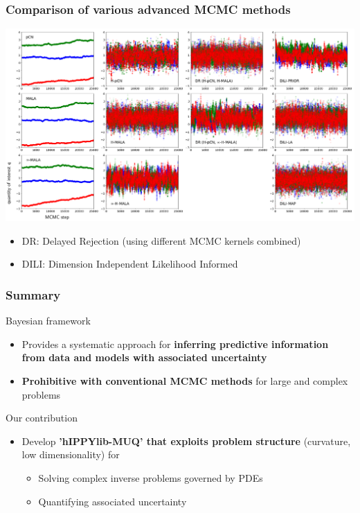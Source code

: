 \documentclass{beamer}
\begin{document}
\begin{frame}[c]
  \frametitle{Comparison of various advanced MCMC methods}

  \begin{center}
    \includegraphics[width=\textwidth]{./figures/ex1_mcmc_trace.pdf}
  \end{center}

  \begin{itemize}
    \item DR: Delayed Rejection (using different MCMC kernels combined)
    \item DILI: Dimension Independent Likelihood Informed
  \end{itemize}
\end{frame}

\begin{frame}[c]
  \frametitle{Summary}

  \begin{alertblock}{Bayesian framework}
    \begin{itemize}
      \item Provides a systematic approach for {\bf inferring predictive
          information from data and models with associated uncertainty}
      \item {\bf Prohibitive with conventional MCMC methods} for large and complex
        problems
    \end{itemize}
  \end{alertblock}

  \begin{alertblock}{Our contribution}
    \begin{itemize}
      \item Develop {\bf 'hIPPYlib-MUQ' that exploits problem structure} (curvature,
        low dimensionality) for
        \begin{itemize}
          \item Solving complex inverse problems governed by PDEs
          \item Quantifying associated uncertainty
        \end{itemize}
    \end{itemize}
  \end{alertblock}

\end{frame}
\end{document}

